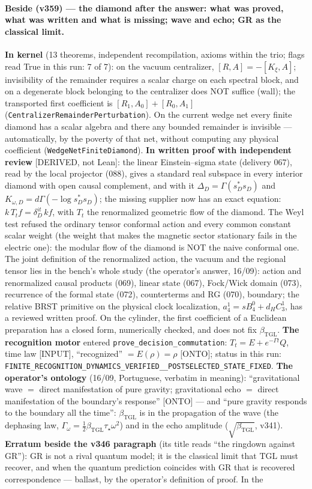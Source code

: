 \documentclass[11pt]{article}
\newcommand{\bTGL}{\beta_{\mathrm{TGL}}}\newcommand{\Msun}{M_{\odot}}\newcommand{\TGL}{\mathrm{TGL}}
\theoremstyle{definition}\newtheorem{deriv}{Derivation}
\begin{document}
\paragraph*{Beside (v359) --- the diamond after the answer: what was proved, what was written and what is missing; wave and echo; GR as the classical limit.} \textbf{In kernel} (13 theorems, independent recompilation, axioms within the trio; flags read True in this run: 7 of 7): on the vacuum centralizer, $[R,A]=-[K_\xi,A]$; invisibility of the remainder requires a scalar charge on each spectral block, and on a degenerate block belonging to the centralizer does NOT suffice (wall); the transported first coefficient is $[R_1,A_0]+[R_0,A_1]$ (\texttt{CentralizerRemainderPerturbation}). On the current wedge net every finite diamond has a scalar algebra and there any bounded remainder is invisible --- automatically, by the poverty of that net, without computing any physical coefficient (\texttt{WedgeNetFiniteDiamond}). \textbf{In written proof with independent review} [DERIVED, not Lean]: the linear Einstein--sigma state (delivery 067), read by the local projector (088), gives a standard real subspace in every interior diamond with open causal complement, and with it $\Delta_D=\Gamma(s_D^*s_D)$ and $K_{\omega,D}=d\Gamma(-\log s_D^*s_D)$; the missing supplier now has an exact equation: $k\,T_t f=\delta_D^{it}\,k f$, with $T_t$ the renormalized geometric flow of the diamond. The Weyl test refused the ordinary tensor conformal action and every common constant scalar weight (the weight that makes the magnetic sector stationary fails in the electric one): the modular flow of the diamond is NOT the naive conformal one. The joint definition of the renormalized action, the vacuum and the regional tensor lies in the bench's whole study (the operator's answer, 16/09): action and renormalized causal products (069), linear state (067), Fock/Wick domain (073), recurrence of the formal state (072), counterterms and RG (070), boundary; the relative BRST primitive on the physical clock localization, $a^1_4=sB^0_4+d_HC^1_3$, has a reviewed written proof. On the cylinder, the first coefficient of a Euclidean preparation has a closed form, numerically checked, and does not fix $\bTGL$. \textbf{The recognition motor} entered \texttt{prove\_decision\_commutation}: $T_t=E+e^{-\Gamma t}Q$, time law [INPUT], ``recognized'' $=E(\rho)=\rho$ [ONTO]; status in this run: \texttt{FINITE\_RECOGNITION\_DYNAMICS\_VERIFIED\_\_POSTSELECTED\_STATE\_FIXED}. \textbf{The operator's ontology} (16/09, Portuguese, verbatim in meaning): ``gravitational wave $=$ direct manifestation of pure gravity; gravitational echo $=$ direct manifestation of the boundary's response'' [ONTO] --- and ``pure gravity responds to the boundary all the time'': $\bTGL$ is in the propagation of the wave (the dephasing law, $\Gamma_\omega=\tfrac12\bTGL\tau_\star\omega^2$) and in the echo amplitude ($\sqrt{\bTGL}$, v341). \textbf{Erratum beside the v346 paragraph} (its title reads ``the ringdown against GR''): GR is not a rival quantum model; it is the classical limit that $\mathrm{TGL}$ must recover, and when the quantum prediction coincides with GR that is recovered correspondence --- ballast, by the operator's definition of proof. In the 
\end{document}
